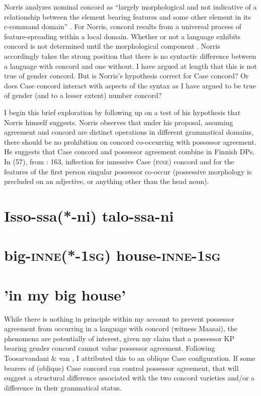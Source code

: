 \documentclass[output=paper
,modfonts
,nonflat]{langsci/langscibook}
\begin{document}
Norris analyzes nominal concord as “largely morphological and not indicative of a relationship between the element bearing features and some other element in its c-command domain” \citep[98]{Norris2014}. For Norris, concord results from a universal process of feature-spreading within a local domain. Whether or not a language exhibits concord is not determined until the morphological component \citep[132]{Norris2014}. Norris accordingly takes the strong position that there is no syntactic difference between a language with concord and one without. I have argued at length that this is not true of gender concord. But is Norris's hypothesis correct for Case concord? Or does Case concord interact with aspects of the syntax as I have argued to be true of gender (and to a lesser extent) number concord?

I begin this brief exploration by following up on a test of his hypothesis that Norris himself suggests. Norris observes that under his proposal, assuming agreement and concord are distinct operations in different grammatical domains, there should be no prohibition on concord co-occurring with possessor agreement. He suggests that Case concord and possessor agreement combine in Finnish DPs. In (57), from \citealt{Norris2014}: 163, inflection for innessive Case (\textsc{inne}) concord and for the features of the first person singular possessor co-occur (possessive morphology is precluded on an adjective, or anything other than the head noun).

\section{Isso-ssa(*-ni)     talo-ssa-ni}
\label{bkm:Ref486589132}\section{  big-\textsc{inne}(*-1\textsc{sg})   house-\textsc{inne}{}-1\textsc{sg}}
\section{ 'in my big house'} 

While there is nothing in principle within my account to prevent possessor agreement from occurring in a language with concord (witness Maasai), the phenomena are potentially of interest, given my claim that a possessor KP bearing gender concord cannot value possessor agreement. Following Toosarvandani \& van \citealt{Urk2014}, I attributed this to an oblique Case configuration. If some bearers of (oblique) Case concord can control possessor agreement, that will suggest a structural difference associated with the two concord varieties and/or a difference in their grammatical status. 
\end{document}
